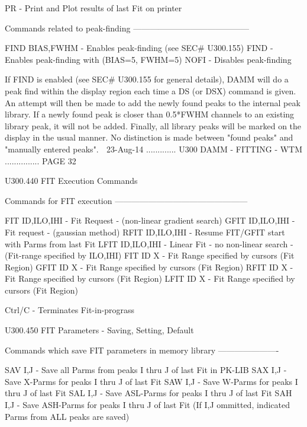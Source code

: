    PR                 - Print and Plot results of last Fit on printer
 
   Commands related to peak-finding ------------------------------------------
 
   FIND  BIAS,FWHM    - Enables  peak-finding (see SEC# U300.155)
   FIND               - Enables  peak-finding with (BIAS=5, FWHM=5)
   NOFI               - Disables peak-finding
 
   If FIND is enabled (see SEC# U300.155 for general details), DAMM will do  a
   peak  find  within  the  display  region each time a DS (or DSX) command is
   given. An attempt will then be made to add the newly  found  peaks  to  the
   internal  peak  library.  If  a  newly  found  peak is closer than 0.5*FWHM
   channels to an existing library peak, it will not be  added.  Finally,  all
   library  peaks  will  be  marked  on  the  display  in the usual manner. No
   distinction is made between "found peaks" and "manually entered peaks".
    
   23-Aug-14 ............. U300  DAMM - FITTING - WTM ............... PAGE  32
 
   U300.440  FIT Execution Commands
 
   Commands for FIT execution ------------------------------------------------
 
   FIT    ID,ILO,IHI  - Fit Request - (non-linear gradient search)
   GFIT   ID,ILO,IHI  - Fit request - (gaussian method)
   RFIT   ID,ILO,IHI  - Resume FIT/GFIT start with Parms from last Fit
   LFIT   ID,ILO,IHI  - Linear Fit - no non-linear search
                      - (Fit-range specified by ILO,IHI)
   FIT    ID X        - Fit Range specified by cursors (Fit Region)
   GFIT   ID X        - Fit Range specified by cursors (Fit Region)
   RFIT   ID X        - Fit Range specified by cursors (Fit Region)
   LFIT   ID X        - Fit Range specified by cursors (Fit Region)
 
   Ctrl/C             - Terminates Fit-in-prograss
 
   U300.450  FIT Parameters - Saving, Setting, Default
 
   Commands which save FIT parameters in memory library ----------------------
 
   SAV    I,J  - Save all Parms from peaks I thru J of last Fit in PK-LIB
   SAX    I,J  - Save X-Parms   for  peaks I thru J of last Fit
   SAW    I,J  - Save W-Parms   for  peaks I thru J of last Fit
   SAL    I,J  - Save ASL-Parms for  peaks I thru J of last Fit
   SAH    I,J  - Save ASH-Parms for  peaks I thru J of last Fit
   (If I,J ommitted, indicated Parms from ALL peaks are saved)
 
